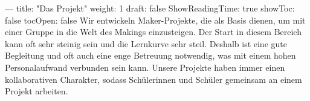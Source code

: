 \markdownRendererDocumentBegin
--- title: "Das Projekt" weight: 1 draft: false ShowReadingTime: true showToc: false tocOpen: false\markdownRendererInterblockSeparator
{}\markdownRendererSectionBegin
\markdownRendererSectionBegin
{}\markdownRendererInterblockSeparator
{}
\markdownRendererSectionEnd \markdownRendererSectionBegin
{}\markdownRendererInterblockSeparator
{}Wir entwickeln Maker-Projekte, die als Basis dienen, um mit einer Gruppe in die Welt des Makings einzusteigen. Der Start in diesem Bereich kann oft sehr steinig sein und die Lernkurve sehr steil. Deshalb ist eine gute Begleitung und oft auch eine enge Betreuung notwendig, was mit einem hohen Personalaufwand verbunden sein kann. Unsere Projekte haben immer einen kollaborativen Charakter, sodass Schülerinnen und Schüler gemeinsam an einem Projekt arbeiten.
\markdownRendererSectionEnd 
\markdownRendererSectionEnd \markdownRendererDocumentEnd
